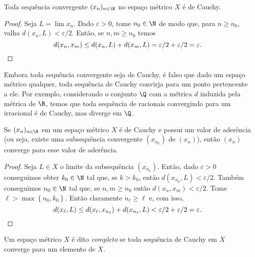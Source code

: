 \begin{prop}
    Toda sequência convergente \( (x_{ n })_{ n \in \N } \) no espaço métrico \( X \) é de Cauchy.
\end{prop}

\begin{proof}
    Seja \( L = \lim x_{ n } \).
    Dado \( \varepsilon > 0 \), tome \( n_{ 0 } \in \N \) de modo que, para \( n \geq n_{ 0 } \), valha \( d(x_{ n }, L) < \varepsilon/2 \).
    Então, se \( n, m \geq n_{ 0 } \) temos \[
        d(x_{ n }, x_{ m }) \leq d(x_{ n }, L) + d(x_{ m }, L) = \varepsilon/2 + \varepsilon/2 = \varepsilon
    .\qedhere\]
\end{proof}

\begin{exmp}
    Embora toda sequência convergente seja de Cauchy, é falso que dado um espaço métrico qualquer, toda sequência de Cauchy convirja para um ponto pertencente a ele.
    Por exemplo, considerando o conjunto \( \Q \) com a métrica \( d \) induzida pela métrica de \( \R \), temos que toda sequência de racionais convergindo para um irracional é de Cauchy, mas diverge em \( \Q \).
\end{exmp}

\begin{prop}
    Se \( ( x_{ n } )_{ n \in \N } \) em um espaço métrico \( X \) é de Cauchy e possui um valor de aderência (ou seja, existe uma subsequência convergente \( ( x_{ n_{ k } } ) \) de \( ( x_{ n } ) \)), então \( ( x_{ n } ) \) converge para esse valor de aderência.
\end{prop}

\begin{proof}
    Seja \( L \in X \) o limite da subsequência \( ( x_{ n_{ k } } ) \).
    Então, dado \( \varepsilon > 0 \) conseguimos obter \( k_{ 0 } \in \N \) tal que, se \( k > k_{ 0 } \), então \( d(x_{ n_{ k } }, L) < \varepsilon/2 \).
    Também conseguimos \( n_{ 0 } \in \N \) tal que, se \( n, m \geq n_{ 0 } \) então \( d(x_{ n }, x_{ m }) < \varepsilon/2 \).
    Tome \( \ell > \max \left\{ n_{ 0 }, k_{ 0 } \right\} \).
    Então claramente \( n_{ \ell } \geq \ell \) e, com isso, \[
        d(x_{ \ell }, L) \leq d(x_{ \ell }, x_{ n_{ \ell } }) + d(x_{ n_{ \ell } }, L) < \varepsilon/2 + \varepsilon/2 = \varepsilon
    .\qedhere\]
\end{proof}


\begin{defn}
    Um espaço métrico \( X \) é dito \emph{completo} se toda sequência de Cauchy em \( X \) converge para um elemento de \( X \).
\end{defn}



